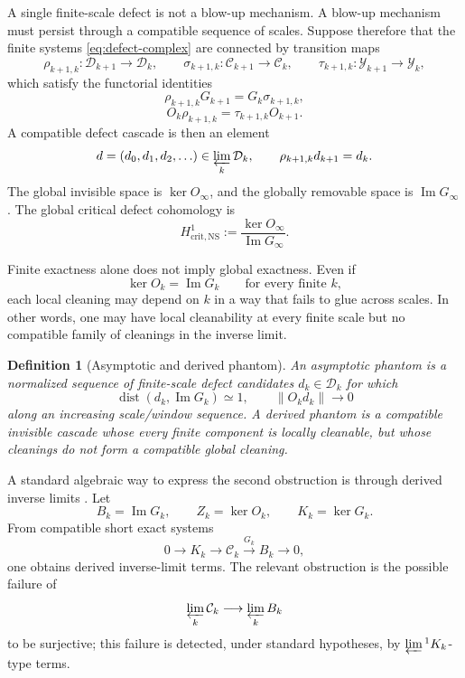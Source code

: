 \documentclass[11pt]{article}
\numberwithin{equation}{section}
\newtheorem{definition}[theorem]{Definition}
\newcommand{\NS}{\mathrm{NS}}
\newcommand{\crit}{\mathrm{crit}}
\newcommand{\calC}{\mathcal C}
\newcommand{\calD}{\mathcal D}
\newcommand{\calY}{\mathcal Y}
\newcommand{\Image}{\operatorname{Im}}
\newcommand{\Dist}{\operatorname{dist}}
\newcommand{\limone}{\varprojlim{}^{1}}
\begin{document}
A single finite-scale defect is not a blow-up mechanism.  A blow-up mechanism must persist through a compatible sequence of scales.  Suppose therefore that the finite systems \eqref{eq:defect-complex} are connected by transition maps
\[
    \rho_{k+1,k}:\calD_{k+1}\to\calD_k,
    \qquad
    \sigma_{k+1,k}:\calC_{k+1}\to\calC_k,
    \qquad
    \tau_{k+1,k}:\calY_{k+1}\to\calY_k,
\]
which satisfy the functorial identities
\begin{equation}\label{eq:functorial-clean}
    \rho_{k+1,k}G_{k+1}=G_k\sigma_{k+1,k},
\end{equation}
\begin{equation}\label{eq:functorial-observe}
    O_k\rho_{k+1,k}=\tau_{k+1,k}O_{k+1}.
\end{equation}
A compatible defect cascade is then an element
\[
    d=(d_0,d_1,d_2,\ldots)\in \varprojlim_k \calD_k,
    \qquad \rho_{k+1,k}d_{k+1}=d_k.
\]
The global invisible space is $\ker O_\infty$, and the globally removable space is $\Image G_\infty$.  The global critical defect cohomology is
\begin{equation}\label{eq:Hcrit}
    H^1_{\crit,\NS}:=\frac{\ker O_\infty}{\Image G_\infty}.
\end{equation}

Finite exactness alone does not imply global exactness.  Even if
\[
    \ker O_k=\Image G_k \qquad \text{for every finite } k,
\]
each local cleaning may depend on $k$ in a way that fails to glue across scales.  In other words, one may have local cleanability at every finite scale but no compatible family of cleanings in the inverse limit.

\begin{definition}[Asymptotic and derived phantom]
An \emph{asymptotic phantom} is a normalized sequence of finite-scale defect candidates $d_k\in\calD_k$ for which
\[
    \Dist(d_k,\Image G_k)\simeq 1,
    \qquad
    \|O_kd_k\|\to0
\]
along an increasing scale/window sequence.  A \emph{derived phantom} is a compatible invisible cascade whose every finite component is locally cleanable, but whose cleanings do not form a compatible global cleaning.
\end{definition}

A standard algebraic way to express the second obstruction is through derived inverse limits \cite{MacLane1963,Weibel1994}.  Let
\[
    B_k=\Image G_k,
    \qquad
    Z_k=\ker O_k,
    \qquad
    K_k=\ker G_k.
\]
From compatible short exact systems
\[
    0\to K_k\to \calC_k\xrightarrow{G_k}B_k\to0,
\]
one obtains derived inverse-limit terms.  The relevant obstruction is the possible failure of
\begin{equation}\label{eq:gluing-surj}
    \varprojlim_k \calC_k\longrightarrow \varprojlim_k B_k
\end{equation}
to be surjective; this failure is detected, under standard hypotheses, by $\limone K_k$-type terms.
\end{document}
